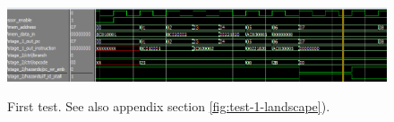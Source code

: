 \begin{figure}[H]
	\caption{First test. See also appendix section \ref{fig:test-1-landscape}).}
	\includegraphics[scale=0.6]{figures/test_1_text.png}
	\label{fig:test-1-text}
\end{figure}
